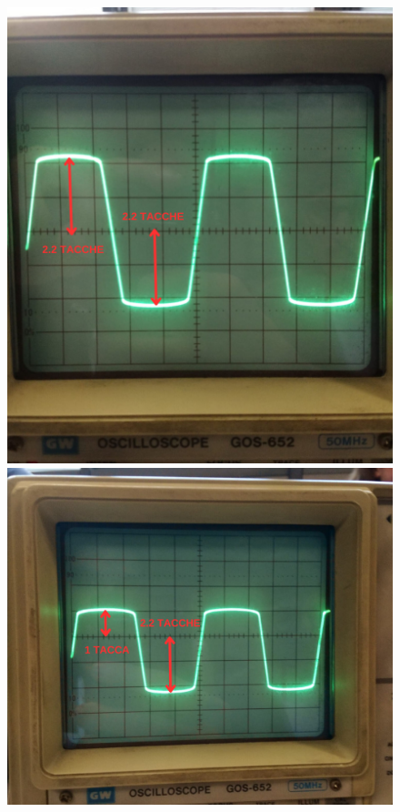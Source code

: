   \begin{figure}[h]
    \includegraphics[width=\textwidth]{../assets/Resistenze_Uguali.png}
    \includegraphics[width=\textwidth]{../assets/Resistenze_Diverse.png}

\end{figure}
